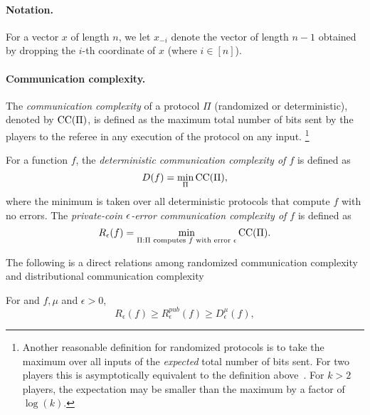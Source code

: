 \paragraph{Notation.}
For a vector $x$ of length $n$, we let $x_{-i}$ denote the vector of length $n-1$ obtained by dropping the $i$-th coordinate of $x$ (where $i \in [n]$).

\paragraph{Communication complexity.}
The \emph{communication complexity} of a protocol $\Pi$ (randomized or deterministic), denoted by $\mathrm{CC}(\Pi)$, is defined as the maximum total number of bits
sent by the players to the referee in any execution of the protocol on any input.%
\footnote{Another reasonable definition for randomized protocols is to take the maximum over all inputs of the \emph{expected} total number of bits sent. For two players this is asymptotically equivalent to the definition above~\cite{KN96}. For $k > 2$ players, the expectation may be smaller than the maximum by a factor of $\log(k)$.}

For a function $f$, the \emph{deterministic communication complexity of $f$} is defined as
\begin{equation*}
	D(f) = \min_{\Pi} \mathrm{CC}(\Pi),
\end{equation*}
where the minimum is taken over all deterministic protocols that compute $f$ with no errors. The \emph{private-coin $\epsilon$-error communication complexity of $f$} is defined as
\begin{equation*}
	R_\epsilon(f) = \min_{\Pi : \text{$\Pi$ computes $f$ with error $\epsilon$}} \mathrm{CC}(\Pi).
\end{equation*}

The following is a direct relations among randomized communication complexity and distributional communication complexity
\begin{theorem}
For and $f, \mu$ and $\epsilon > 0$,
\begin{equation*}
	R_{\epsilon}(f)\geq R^{pub}_{\epsilon}(f)\geq D^{\mu}_{\epsilon}(f),
\end{equation*}
\end{theorem}